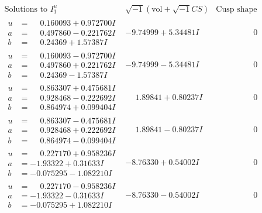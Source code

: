 \documentclass[1p]{elsarticle_modified}
\theoremstyle{definition}
\newcommand{\I}{\sqrt{-1}}
\begin{document}
$$\begin{array}{c|c|c}  
\text{Solutions to }I^u_{1}& \I (\text{vol} + \sqrt{-1}CS) & \text{Cusp shape}\\
 \hline 
\begin{aligned}
u &= \phantom{-}0.160093 + 0.972700 I \\
a &= \phantom{-}0.497860 - 0.221762 I \\
b &= \phantom{-}0.24369 + 1.57387 I\end{aligned}
 & -9.74999 + 5.34481 I & \phantom{-0.000000 } 0 \\ \hline\begin{aligned}
u &= \phantom{-}0.160093 - 0.972700 I \\
a &= \phantom{-}0.497860 + 0.221762 I \\
b &= \phantom{-}0.24369 - 1.57387 I\end{aligned}
 & -9.74999 - 5.34481 I & \phantom{-0.000000 } 0 \\ \hline\begin{aligned}
u &= \phantom{-}0.863307 + 0.475681 I \\
a &= \phantom{-}0.928468 - 0.222692 I \\
b &= \phantom{-}0.864974 + 0.099404 I\end{aligned}
 & \phantom{-}1.89841 + 0.80237 I & \phantom{-0.000000 } 0 \\ \hline\begin{aligned}
u &= \phantom{-}0.863307 - 0.475681 I \\
a &= \phantom{-}0.928468 + 0.222692 I \\
b &= \phantom{-}0.864974 - 0.099404 I\end{aligned}
 & \phantom{-}1.89841 - 0.80237 I & \phantom{-0.000000 } 0 \\ \hline\begin{aligned}
u &= \phantom{-}0.227170 + 0.958236 I \\
a &= -1.93322 + 0.31633 I \\
b &= -0.075295 - 1.082210 I\end{aligned}
 & -8.76330 + 0.54002 I & \phantom{-0.000000 } 0 \\ \hline\begin{aligned}
u &= \phantom{-}0.227170 - 0.958236 I \\
a &= -1.93322 - 0.31633 I \\
b &= -0.075295 + 1.082210 I\end{aligned}
 & -8.76330 - 0.54002 I & \phantom{-0.000000 } 0 \\ \hline\begin{aligned}

\end{aligned}
\end{array}$$
\end{document}
